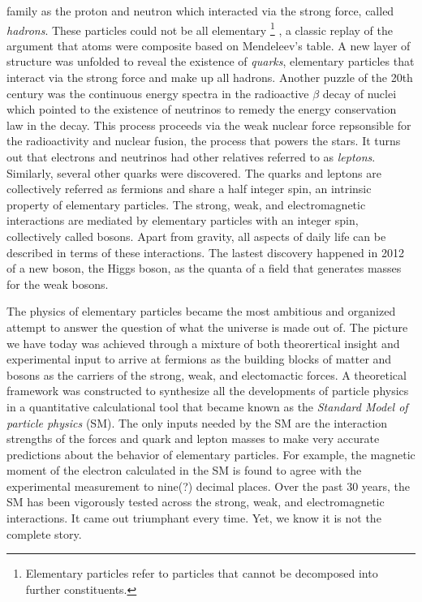 family as the proton and neutron which interacted via the strong force, called \textit{hadrons}.
These particles could not be all elementary
\footnote{Elementary particles refer to  particles that cannot be decomposed into further constituents.}
, a classic replay of the argument that atoms were composite based on Mendeleev's table.
A new layer of structure was unfolded to reveal the existence of \textit{quarks}, elementary 
particles that interact via the strong force and make up all hadrons. 
Another puzzle of the 20th century was the continuous energy spectra in the radioactive $\beta$ decay of nuclei which pointed to the 
existence of neutrinos to remedy the energy conservation law in the decay. This process proceeds via the weak nuclear force 
repsonsible for the radioactivity and nuclear fusion, the process that powers the stars.
It turns out that electrons and neutrinos had other relatives referred to as \textit{leptons}.
Similarly, several other quarks were discovered.%
The quarks and leptons are collectively referred as fermions and
share a half integer spin, an intrinsic property of elementary particles.
The strong, weak, and electromagnetic interactions are mediated by elementary particles with an integer spin, 
collectively called bosons. Apart from gravity, all aspects of daily life can be described in terms of these interactions.
The lastest discovery happened in 2012 of a new boson, the Higgs boson, as the quanta of a field that generates masses for the weak 
bosons.

The physics of elementary particles became the most ambitious and organized attempt to answer the question of what the universe is 
made out of. 
The picture we have today was achieved through a mixture of both theorertical insight and experimental input to arrive at 
fermions  as the building blocks of matter and bosons as the carriers of the strong, weak, and electomactic forces.
A theoretical framework was constructed to synthesize all the developments of particle physics in a quantitative 
calculational tool that became known as the \textit{Standard Model of particle physics} (SM). 
The only inputs needed by the SM are the interaction strengths of the forces and quark and lepton masses to make 
very accurate predictions about the behavior of elementary particles.
For example, the magnetic moment of the electron calculated in the SM is found to agree 
with the experimental measurement to nine(?) decimal places. 
Over the past 30 years, the SM has been vigorously tested across the strong, weak, and electromagnetic interactions. 
It came out triumphant every time. Yet, we know it is not the complete story. 

